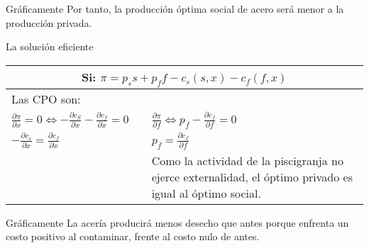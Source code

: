 \begin{frame}{Gráficamente}
Por tanto, la producción óptima social de acero será menor a la producción privada.
	\begin{center}
		
	\end{center}
\end{frame}
\begin{frame}{La solución eficiente}
	\begin{center}
		\begingroup
		\setlength{\tabcolsep}{10pt} %
		\renewcommand{\arraystretch}{1.5} %
			\begin{tabular}{p{4cm}cp{4cm}}
				\hline
					\multicolumn{3}{c}{Si: $\pi= p_ss + p_ff - c_s(s,x) - c_f(f,x)$} \\
				\hline
					Las CPO son: &{}&\\
				\hline
					$\frac{\partial \pi}{\partial x} = 0 \Leftrightarrow -\frac{\partial c_S}{\partial x} - \frac{\partial c_f}{\partial x} = 0$ &{}& $\frac{\partial \pi}{\partial f} \Leftrightarrow p_f - \frac{\partial c_f}{\partial f} = 0$\\
					$-\frac{\partial c_s}{\partial x} = \frac{\partial c_f}{\partial x}$ &{}& $p_f = \frac{\partial c_f}{\partial f}$\\
					&{}& Como la actividad de la piscigranja no ejerce externalidad, el óptimo privado es igual al óptimo social. \\
				\hline
			\end{tabular}
		\endgroup
	\end{center}
\end{frame}
\begin{frame}{Gráficamente}
La acería producirá menos desecho que antes porque enfrenta un costo positivo al contaminar, frente al costo nulo de antes.
	\begin{center}
		
	\end{center}
\end{frame}